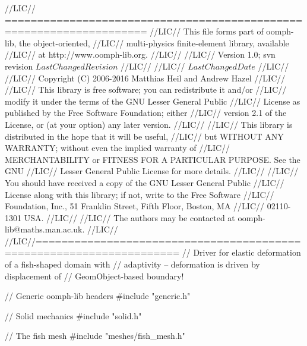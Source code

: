 \begin{DoxyCodeInclude}
\textcolor{comment}{//LIC// ====================================================================}
\textcolor{comment}{//LIC// This file forms part of oomph-lib, the object-oriented, }
\textcolor{comment}{//LIC// multi-physics finite-element library, available }
\textcolor{comment}{//LIC// at http://www.oomph-lib.org.}
\textcolor{comment}{//LIC// }
\textcolor{comment}{//LIC//    Version 1.0; svn revision $LastChangedRevision$}
\textcolor{comment}{//LIC//}
\textcolor{comment}{//LIC// $LastChangedDate$}
\textcolor{comment}{//LIC// }
\textcolor{comment}{//LIC// Copyright (C) 2006-2016 Matthias Heil and Andrew Hazel}
\textcolor{comment}{//LIC// }
\textcolor{comment}{//LIC// This library is free software; you can redistribute it and/or}
\textcolor{comment}{//LIC// modify it under the terms of the GNU Lesser General Public}
\textcolor{comment}{//LIC// License as published by the Free Software Foundation; either}
\textcolor{comment}{//LIC// version 2.1 of the License, or (at your option) any later version.}
\textcolor{comment}{//LIC// }
\textcolor{comment}{//LIC// This library is distributed in the hope that it will be useful,}
\textcolor{comment}{//LIC// but WITHOUT ANY WARRANTY; without even the implied warranty of}
\textcolor{comment}{//LIC// MERCHANTABILITY or FITNESS FOR A PARTICULAR PURPOSE.  See the GNU}
\textcolor{comment}{//LIC// Lesser General Public License for more details.}
\textcolor{comment}{//LIC// }
\textcolor{comment}{//LIC// You should have received a copy of the GNU Lesser General Public}
\textcolor{comment}{//LIC// License along with this library; if not, write to the Free Software}
\textcolor{comment}{//LIC// Foundation, Inc., 51 Franklin Street, Fifth Floor, Boston, MA}
\textcolor{comment}{//LIC// 02110-1301  USA.}
\textcolor{comment}{//LIC// }
\textcolor{comment}{//LIC// The authors may be contacted at oomph-lib@maths.man.ac.uk.}
\textcolor{comment}{//LIC// }
\textcolor{comment}{//LIC//====================================================================}
\textcolor{comment}{// Driver for elastic deformation of a fish-shaped domain with}
\textcolor{comment}{// adaptivity -- deformation is driven by displacement of}
\textcolor{comment}{// GeomObject-based boundary!}

 
\textcolor{comment}{// Generic oomph-lib headers}
\textcolor{preprocessor}{#include "generic.h"}

\textcolor{comment}{// Solid mechanics}
\textcolor{preprocessor}{#include "solid.h"}

\textcolor{comment}{// The fish mesh }
\textcolor{preprocessor}{#include "meshes/fish\_mesh.h"}


\end{DoxyCodeInclude}

